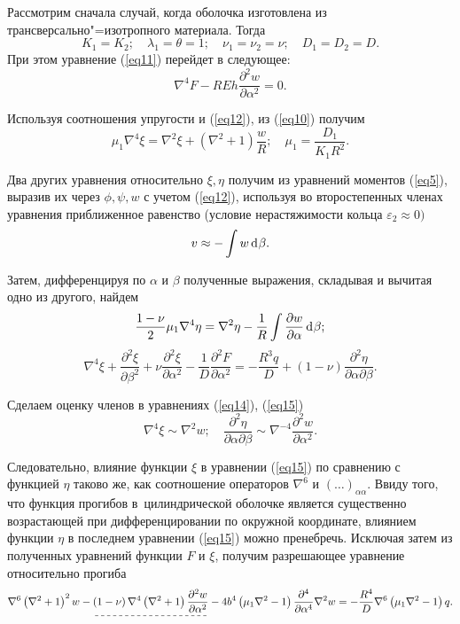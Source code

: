 \documentclass[press]{vestnik}
\begin{document}
Рассмотрим сначала случай, когда оболочка изготовлена из 
трансверсально"=изотропного материала. Тогда
\[
K_{1} =K_{2} ;
\quad
\lambda_{1} =\theta =1;
\quad
\nu_{1} =\nu_{2} =\nu ;
\quad
D_{1} =D_{2} =D.
\]
При этом уравнение (\ref{eq11}) перейдет в следующее:
\begin{equation}
\label{eq13}
\nabla^{4}F-REh\frac{\partial^{2}w}{\partial \alpha^{2}}=0.
\end{equation}

Используя соотношения упругости и (\ref{eq12}), из (\ref{eq10}) получим
\begin{equation}
\label{eq14}
\mu_{1} \nabla^{4}\xi =\nabla^{2}\xi +\left( {\nabla^{2}+1} 
\right)\frac{w}{R};
\quad
\mu_{1} =\frac{D_{1} }{K_{1} R^{2}}.
\end{equation}

Два других уравнения относительно $\xi ,\eta $ получим из уравнений моментов 
(\ref{eq5}), выразив их через $\phi ,\psi ,w$ с учетом (\ref{eq12}), используя во 
второстепенных членах уравнения приближенное равенство (условие 
нерастяжимости кольца $\varepsilon_{2} \approx 0)$
\[
v\approx -\int {w\d\beta } .
\]

Затем, дифференцируя по $\alpha $ и $\beta $ полученные выражения, складывая 
и вычитая одно из другого, найдем
\begin{equation}
\label{eq15}
\frac{1-\nu }{2}\mu_{1} \nabla^{4}\eta =\nabla^{2}\eta -\frac{1}{R}\int 
{\frac{\partial w}{\partial \alpha }\d\beta } ;
\end{equation}
\[
\nabla^{4}\xi +\frac{\partial^{2}\xi }{\partial \beta^{2}}+\nu 
\frac{\partial^{2}\xi }{\partial \alpha^{2}}-\frac{1}{D}\frac{\partial 
^{2}F}{\partial \alpha^{2}}=-\frac{R^{3}q}{D}+\left( {1-\nu } 
\right)\frac{\partial^{2}\eta }{\partial \alpha \partial \beta }.
\]

Сделаем оценку членов в уравнениях (\ref{eq14}), (\ref{eq15})
\[
\nabla^{4}\xi \sim \nabla^{2}w;
\quad
\frac{\partial^{2}\eta}{\partial \alpha \partial \beta } \sim \nabla^{-4}\frac{\partial^{2}w}{\partial \alpha^{2}}.
\]

Следовательно, влияние функции $\xi $ в уравнении (\ref{eq15}) по сравнению с 
функцией $\eta $ таково же, как соотношение операторов $\nabla^{6}$ и 
$\left( {\ldots} \right)_{\alpha \alpha } $. Ввиду того, что функция прогибов 
в~цилиндрической оболочке является существенно возрастающей при 
дифференцировании по окружной координате, влиянием функции $\eta $ в 
последнем уравнении (\ref{eq15}) можно пренебречь. Исключая затем из полученных 
уравнений функции $F$ и $\xi $, получим разрешающее уравнение относительно 
прогиба
\[
\nabla^{6}\left( {\nabla^{2}+1} \right)^{2}w- \dashuline{\left( {1-\nu } \right)\nabla^{4}\left( {\nabla^{2}+1} \right)\frac{\partial^{2}w}{\partial \alpha^{2}}}-4b^{4}\left( {\mu_{1} \nabla^{2}-1} \right)\frac{\partial^{4}}{\partial \alpha^{4}}\nabla^{2}w=-\frac{R^{4}}{D}\nabla^{6}\left( {\mu_{1} \nabla^{2}-1} \right)q.
\]
\end{document}
